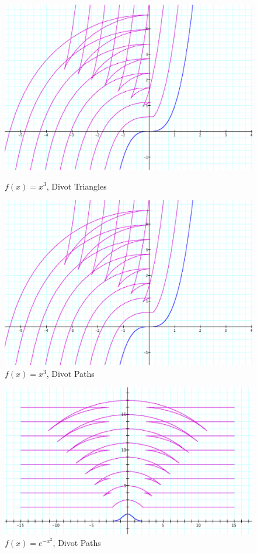 \begin{figure}[h!] 
  \label{example-4}
  \begin{minipage}[b]{0.5\linewidth}
    \centering
    \includegraphics[width=.9\linewidth]{some-examples-img/Fig 10.png}
    \caption{$f(x) = x^3$, Divot Triangles}
    \label{fig:fig10}
    \vspace{4ex}
  \end{minipage} %
  \begin{minipage}[b]{0.5\linewidth}
    \centering
    \includegraphics[width=.9\linewidth]{some-examples-img/Fig 11.png}
    \caption{$f(x) = x^3$, Divot Paths}
    \label{fig:fig11}
    \vspace{4ex}
  \end{minipage} %
\end{figure}

\begin{figure}[h!] 
  \centering
  \label{example-5}
  \begin{minipage}[b]{0.8\linewidth}
    \centering
    \includegraphics[width=.9\linewidth]{some-examples-img/Fig 12.png}
    \caption{$f(x) = e^{-x^2}$, Divot Paths}
    \label{fig:fig12}
    \vspace{4ex}
  \end{minipage} %
\end{figure}

